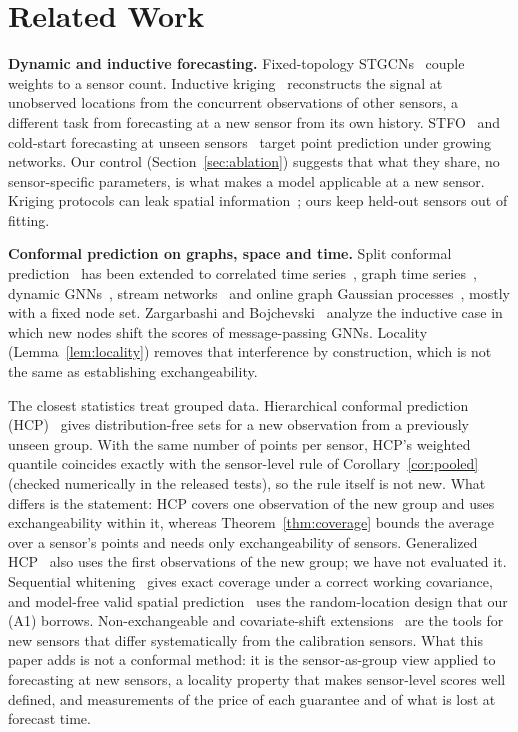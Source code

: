 \section{Related Work}
\label{sec:related}

\textbf{Dynamic and inductive forecasting.} Fixed-topology STGCNs~\cite{yu2018stgcn} couple weights to a sensor
count. Inductive kriging~\cite{ignnk2020} reconstructs the signal at unobserved locations from the concurrent
observations of other sensors, a different task from forecasting at a new sensor from its own history. STFO~\cite{stfo2026} and cold-start forecasting at unseen
sensors~\cite{coldstart_unseen2026} target point prediction under growing networks. Our control (Section~\ref{sec:ablation}) suggests that what they share, no sensor-specific parameters, is what makes a model applicable at a new sensor.  Kriging protocols can leak spatial information~\cite{yang2026leakagefree}; ours keep held-out sensors out of fitting.

\textbf{Conformal prediction on graphs, space and time.} Split
conformal prediction~\cite{vovk2005algorithmic,angelopoulos2023conformal} has been extended to correlated time
series~\cite{corel2025}, graph time series~\cite{conformalgraphts2026,incontextresidual2026}, dynamic GNNs~\cite{validcpdyngnn2024,nonexchcptgnn2025}, stream networks~\cite{staci2025} and online graph Gaussian processes~\cite{conformalgp_online2025}, mostly with a fixed node set. Zargarbashi and
Bojchevski~\cite{conformalinductivegnn2024} analyze the inductive case in which new nodes shift the scores of
message-passing GNNs. Locality (Lemma~\ref{lem:locality}) removes that interference by construction, which is not
the same as establishing exchangeability.

The closest statistics treat grouped data. Hierarchical conformal prediction
(HCP)~\cite{lee2023hcp} gives distribution-free sets for a new observation from a previously unseen group. With the
same number of points per sensor, HCP's weighted quantile coincides exactly with the sensor-level rule of
Corollary~\ref{cor:pooled} (checked numerically in the released tests), so the rule itself is not new. What differs is the statement: HCP covers one observation of the new group and uses exchangeability within it, whereas Theorem~\ref{thm:coverage} bounds the average over a sensor's points and needs only exchangeability of sensors. Generalized HCP~\cite{mallick2026ghcp} also uses the first observations of the new
group; we have not evaluated it. Sequential
whitening~\cite{sen2026whitening} gives exact coverage under a correct working covariance, and model-free valid
spatial prediction~\cite{validspatial2020} uses the random-location design that our (A1) borrows. Non-exchangeable and
covariate-shift extensions~\cite{barber2023nexcp,tibshirani2019covshift} are the tools for new sensors that differ
systematically from the calibration sensors. What this paper adds is not a conformal method: it is the
sensor-as-group view applied to forecasting at new sensors, a locality property that makes sensor-level scores well
defined, and measurements of the price of each guarantee and of what is lost at forecast time.
